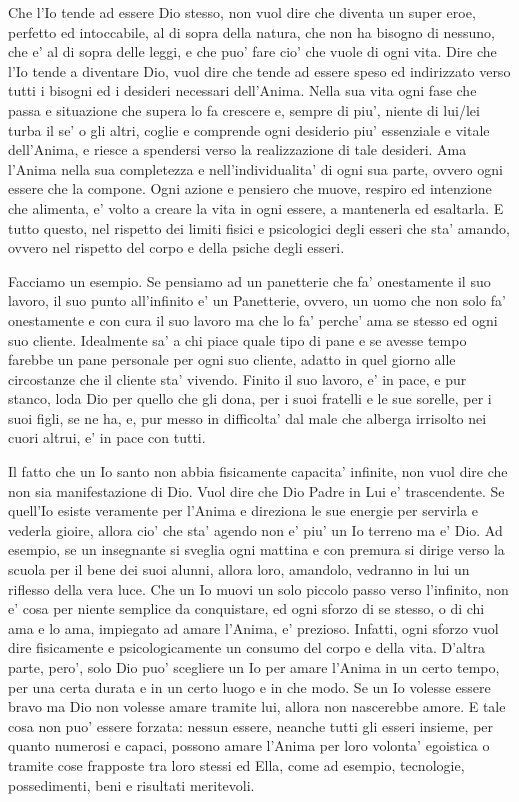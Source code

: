 Che l'Io tende ad essere Dio stesso, non vuol dire che diventa un super eroe, perfetto ed intoccabile, al di sopra della natura, che non ha bisogno di nessuno, che e' al di sopra delle leggi, e che puo' fare cio' che vuole di ogni vita. 
Dire che l'Io tende a diventare Dio, vuol dire che tende ad essere speso ed indirizzato verso tutti i bisogni ed i desideri necessari dell'Anima. Nella sua vita ogni fase che passa e situazione che supera lo fa crescere e, sempre di piu', niente di lui/lei turba il se' o gli altri, coglie e comprende ogni desiderio piu' essenziale e vitale dell'Anima, e riesce a spendersi verso la realizzazione di tale desideri. Ama l'Anima nella sua completezza e nell'individualita' di ogni sua parte, ovvero ogni essere che la compone. Ogni azione e pensiero che muove, respiro ed intenzione che alimenta, e' volto a creare la vita in ogni essere, a mantenerla ed esaltarla. E tutto questo, nel rispetto dei limiti fisici e psicologici degli esseri che sta' amando, ovvero nel rispetto del corpo e della psiche degli esseri.

Facciamo un esempio. Se pensiamo ad un panetterie che fa' onestamente il suo lavoro, il suo punto all'infinito e' un Panetterie, ovvero, un uomo che non solo fa' onestamente e con cura il suo lavoro ma che lo fa' perche' ama se stesso ed ogni suo cliente. Idealmente sa' a chi piace quale tipo di pane e se avesse tempo farebbe un pane personale per ogni suo cliente, adatto in quel giorno alle circostanze che il cliente sta' vivendo. Finito il suo lavoro, e' in pace, e pur stanco, loda Dio per quello che gli dona, per i suoi fratelli e le sue sorelle, per i suoi figli, se ne ha, e, pur messo in difficolta' dal male che alberga irrisolto nei cuori altrui, e' in pace con tutti. 

Il fatto che un Io santo non abbia fisicamente capacita' infinite, non vuol dire che non sia manifestazione di Dio. Vuol dire che Dio Padre in Lui e' trascendente. Se quell'Io esiste veramente per l'Anima e direziona le sue energie per servirla e vederla gioire, allora cio' che sta' agendo non e' piu' un Io terreno ma e' Dio.
Ad esempio, se un insegnante si sveglia ogni mattina e con premura si dirige verso la scuola per il bene dei suoi alunni, allora loro, amandolo, vedranno in lui un riflesso della vera luce.
Che un Io muovi un solo piccolo passo verso l'infinito, non e' cosa per niente semplice da conquistare, ed ogni sforzo di se stesso, o di chi ama e lo ama, impiegato ad amare l'Anima, e' prezioso. Infatti, ogni sforzo vuol dire fisicamente e psicologicamente un consumo del corpo e della vita.
D'altra parte, pero', solo Dio puo' scegliere un Io per amare l'Anima in un certo tempo, per una certa durata e in un certo luogo e in che modo. Se un Io volesse essere bravo ma Dio non volesse amare tramite lui, allora non nascerebbe amore. E tale cosa non puo' essere forzata: nessun essere, neanche tutti gli esseri insieme, per quanto numerosi e capaci, possono amare l'Anima per loro volonta' egoistica o tramite cose frapposte tra loro stessi ed Ella, come ad esempio, tecnologie, possedimenti, beni e risultati meritevoli. 

